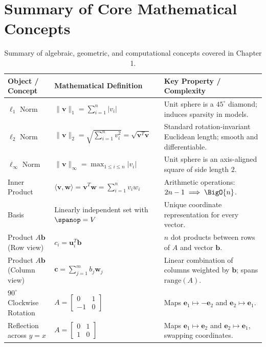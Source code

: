 \FloatBarrier
\section{Summary of Core Mathematical Concepts}

\begin{table}[H]
  \centering
  \small
  \setlength{\tabcolsep}{5pt}
  \begin{tabularx}{\textwidth}{l Y Y}
    \toprule
    \textbf{Object / Concept} & \textbf{Mathematical Definition} & \textbf{Key Property / Complexity} \\
    \midrule
    $\ell_1$ Norm & $\|\mathbf{v}\|_1 = \sum_{i=1}^n |v_i|$ & Unit sphere is a $45^\circ$ diamond; induces sparsity in models. \\
    $\ell_2$ Norm & $\|\mathbf{v}\|_2 = \sqrt{\sum_{i=1}^n v_i^2} = \sqrt{\mathbf{v}^T \mathbf{v}}$ & Standard rotation-invariant Euclidean length; smooth and differentiable. \\
    $\ell_\infty$ Norm & $\|\mathbf{v}\|_\infty = \max_{1 \le i \le n} |v_i|$ & Unit sphere is an axis-aligned square of side length $2$. \\
    Inner Product & $\langle \mathbf{v}, \mathbf{w} \rangle = \mathbf{v}^T \mathbf{w} = \sum_{i=1}^n v_i w_i$ & Arithmetic operations: $2n - 1 \implies \BigO{n}$. \\
    Basis & Linearly independent set with $\spanop = V$ & Unique coordinate representation for every vector. \\
    Product $A \mathbf{b}$ (Row view) & $c_i = \mathbf{u}_i^T \mathbf{b}$ & $n$ dot products between rows of $A$ and vector $\mathbf{b}$. \\
    Product $A \mathbf{b}$ (Column view) & $\mathbf{c} = \sum_{j=1}^m b_j \mathbf{w}_j$ & Linear combination of columns weighted by $\mathbf{b}$; spans $\mathrm{range}(A)$. \\
    $90^\circ$ Clockwise Rotation & $A = \begin{bmatrix} 0 & 1 \\ -1 & 0 \end{bmatrix}$ & Maps $\mathbf{e}_1 \mapsto -\mathbf{e}_2$ and $\mathbf{e}_2 \mapsto \mathbf{e}_1$. \\
    Reflection across $y = x$ & $A = \begin{bmatrix} 0 & 1 \\ 1 & 0 \end{bmatrix}$ & Maps $\mathbf{e}_1 \mapsto \mathbf{e}_2$ and $\mathbf{e}_2 \mapsto \mathbf{e}_1$, swapping coordinates. \\
    \bottomrule
  \end{tabularx}
  \caption{Summary of algebraic, geometric, and computational concepts covered in Chapter 1.}
  \label{tab:summary-chapter-1-en}
\end{table}
